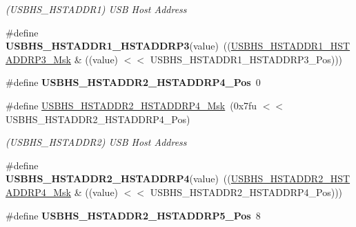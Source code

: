 \begin{DoxyCompactItemize}
\begin{DoxyCompactList}\small\item\em (U\+S\+B\+H\+S\+\_\+\+H\+S\+T\+A\+D\+D\+R1) U\+SB Host Address \end{DoxyCompactList}\item 
\mbox{\label{group__SAMV71__USBHS_ga0e6cd7201d7dc57bcb0ec67dd5a8b0a9}} 
\#define {\bfseries U\+S\+B\+H\+S\+\_\+\+H\+S\+T\+A\+D\+D\+R1\+\_\+\+H\+S\+T\+A\+D\+D\+R\+P3}(value)~((\mbox{\hyperlink{group__SAMV71__USBHS_gac393d1ef7204508fbd9ff3028522ffbd}{U\+S\+B\+H\+S\+\_\+\+H\+S\+T\+A\+D\+D\+R1\+\_\+\+H\+S\+T\+A\+D\+D\+R\+P3\+\_\+\+Msk}} \& ((value) $<$$<$ U\+S\+B\+H\+S\+\_\+\+H\+S\+T\+A\+D\+D\+R1\+\_\+\+H\+S\+T\+A\+D\+D\+R\+P3\+\_\+\+Pos)))
\item 
\mbox{\label{group__SAMV71__USBHS_gaec3f333b445e6112fd3e29edf6ca4250}} 
\#define {\bfseries U\+S\+B\+H\+S\+\_\+\+H\+S\+T\+A\+D\+D\+R2\+\_\+\+H\+S\+T\+A\+D\+D\+R\+P4\+\_\+\+Pos}~0
\item 
\mbox{\label{group__SAMV71__USBHS_ga420ac4febfb6b3450b97cd0e77e79f04}} 
\#define \mbox{\hyperlink{group__SAMV71__USBHS_ga420ac4febfb6b3450b97cd0e77e79f04}{U\+S\+B\+H\+S\+\_\+\+H\+S\+T\+A\+D\+D\+R2\+\_\+\+H\+S\+T\+A\+D\+D\+R\+P4\+\_\+\+Msk}}~(0x7fu $<$$<$ U\+S\+B\+H\+S\+\_\+\+H\+S\+T\+A\+D\+D\+R2\+\_\+\+H\+S\+T\+A\+D\+D\+R\+P4\+\_\+\+Pos)
\begin{DoxyCompactList}\small\item\em (U\+S\+B\+H\+S\+\_\+\+H\+S\+T\+A\+D\+D\+R2) U\+SB Host Address \end{DoxyCompactList}\item 
\mbox{\label{group__SAMV71__USBHS_gabbf6e6f34c9e82dee526b5f2d49322dc}} 
\#define {\bfseries U\+S\+B\+H\+S\+\_\+\+H\+S\+T\+A\+D\+D\+R2\+\_\+\+H\+S\+T\+A\+D\+D\+R\+P4}(value)~((\mbox{\hyperlink{group__SAMV71__USBHS_ga420ac4febfb6b3450b97cd0e77e79f04}{U\+S\+B\+H\+S\+\_\+\+H\+S\+T\+A\+D\+D\+R2\+\_\+\+H\+S\+T\+A\+D\+D\+R\+P4\+\_\+\+Msk}} \& ((value) $<$$<$ U\+S\+B\+H\+S\+\_\+\+H\+S\+T\+A\+D\+D\+R2\+\_\+\+H\+S\+T\+A\+D\+D\+R\+P4\+\_\+\+Pos)))
\item 
\mbox{\label{group__SAMV71__USBHS_ga1127285ccfd83e8e4f9aa3ad3d3b78de}} 
\#define {\bfseries U\+S\+B\+H\+S\+\_\+\+H\+S\+T\+A\+D\+D\+R2\+\_\+\+H\+S\+T\+A\+D\+D\+R\+P5\+\_\+\+Pos}~8
$$
\end{DoxyCompactItemize}
